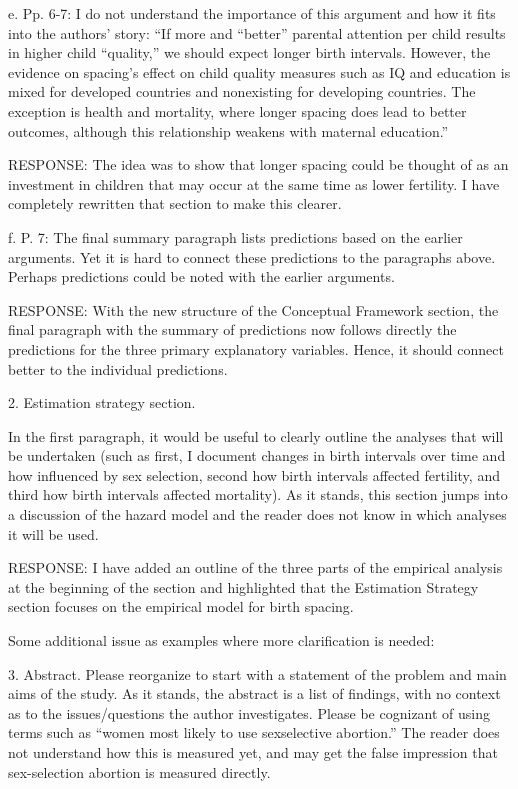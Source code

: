 \documentclass[letterpaper,12pt]{article}
\begin{document}
e. Pp. 6-7: I do not understand the importance of this argument and how it fits into the
authors’ story: “If more and “better” parental attention per child results in higher child
“quality,” we should expect longer birth intervals. However, the evidence on spacing’s
effect on child quality measures such as IQ and education is mixed for developed countries
and nonexisting for developing countries. The exception is health and mortality, where
longer spacing does lead to better outcomes, although this relationship weakens with
maternal education.”

RESPONSE: The idea was to show that longer spacing could be thought of as an investment
in children that may occur at the same time as lower fertility.
I have completely rewritten that section to make this clearer. 


f. P. 7: The final summary paragraph lists predictions based on the earlier arguments. Yet
it is hard to connect these predictions to the paragraphs above. Perhaps predictions could
be noted with the earlier arguments.

RESPONSE: With the new structure of the Conceptual Framework section, the final paragraph
with the summary of predictions now follows directly the predictions for the three primary
explanatory variables.
Hence, it should connect better to the individual predictions.


2. Estimation strategy section.

In the first paragraph, it would be useful to clearly outline the analyses that will be
undertaken (such as first, I document changes in birth intervals over time and how
influenced by sex selection, second how birth intervals affected fertility, and third how
birth intervals affected mortality). As it stands, this section jumps into a discussion of
the hazard model and the reader does not know in which analyses it will be used.

RESPONSE: I have added an outline of the three parts of the empirical analysis at the 
beginning of the section and highlighted that the Estimation Strategy section focuses
on the empirical model for birth spacing.


Some additional issue as examples where more clarification is needed:

3. Abstract. Please reorganize to start with a statement of the problem and main aims of
the study. As it stands, the abstract is a list of findings, with no context as to the
issues/questions the author investigates. Please be cognizant of using terms such as “women
most likely to use sexselective abortion.” The reader does not understand how this is
measured yet, and may get the false impression that sex-selection abortion is measured
directly.
\end{document}
